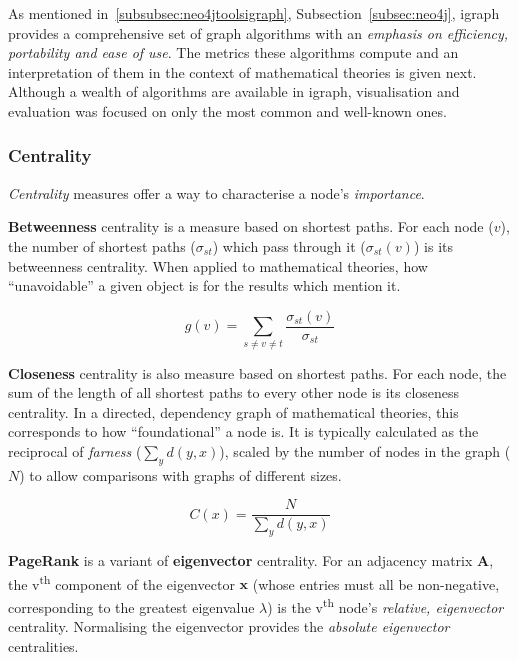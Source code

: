 As mentioned in~\ref{subsubsec:neo4jtoolsigraph},
Subsection~\ref{subsec:neo4j}, igraph provides a comprehensive set of graph
algorithms with an \emph{emphasis on efficiency, portability and ease of use}.
The metrics these algorithms compute and an interpretation of them in the
context of mathematical theories is given next. Although a wealth of
algorithms are available in igraph, visualisation and evaluation was focused
on only the most common and well-known ones.

\subsubsection{Centrality}

\emph{Centrality} measures offer a way to characterise a node's
\emph{importance}.

\textbf{Betweenness} centrality is a measure based on shortest paths. For each
node ($v$), the number of shortest paths ($\sigma_{st}$) which pass through it
($\sigma_{st}\left(v\right)$) is its betweenness centrality. When applied to
mathematical theories, how ``unavoidable'' a given object is for the results
which mention it.~\cite{freeman1977}

\begin{equation}
  g\left(v\right) = \sum_{s \neq v \neq t} \frac{\sigma_{st}\left(v\right)}{\sigma_{st}}
\end{equation}

\textbf{Closeness} centrality is also measure based on shortest paths. For each
node, the sum of the length of all shortest paths to every other node is its
closeness centrality. In a directed, dependency graph of mathematical theories,
this corresponds to how ``foundational'' a node is. It is typically calculated
as the reciprocal of \emph{farness} ($\sum_{y}d\left(y,x\right)$), scaled by
the number of nodes in the graph ($N$) to allow comparisons with graphs of
different sizes.~\cite{bavelas1950}

\begin{equation}
  C\left(x\right) = \frac{N}{\sum_{y}d\left(y,x\right)}
\end{equation}

\textbf{PageRank} is a variant of \textbf{eigenvector} centrality.  For an
adjacency matrix $\mathbf{A}$, the v\textsuperscript{th} component of the
eigenvector $\mathbf{x}$ (whose entries must all be non-negative, corresponding
to the greatest eigenvalue $\lambda$) is the v\textsuperscript{th} node's
\emph{relative, eigenvector} centrality. Normalising the eigenvector provides
the \emph{absolute eigenvector} centralities.~\cite{newman2008}

